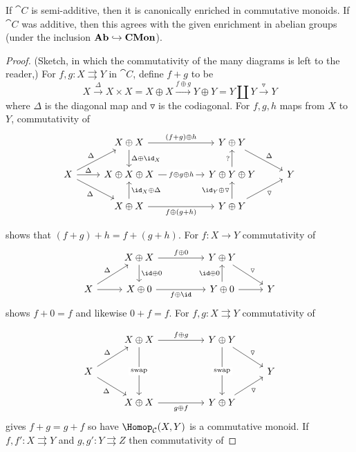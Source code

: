 \documentclass[../main.tex]{subfiles}
\begin{document}
\begin{lem}
	If $\cat C$ is semi-additive, then it is canonically enriched in commutative monoids. If $\cat C$ was additive, then this agrees with the given enrichment in abelian groups (under the inclusion $\mathbf{Ab} \hookrightarrow \mathbf{CMon}$).
\end{lem}
\begin{proof}(Sketch, in which the commutativity of the many diagrams is left to the reader,)
	For $f, g: X \rightrightarrows Y$ in $\cat C$, define $f + g$ to be
	\[
		X \xrightarrow{\Delta} X \times X = X \oplus X \xrightarrow{f \oplus g} Y \oplus Y = Y \coprod Y \xrightarrow{\triangledown} Y
	\] where $\Delta$ is the diagonal map and $\triangledown$ is the codiagonal.
	For $f, g, h$ maps from $X$ to $Y$, commutativity of 
\[\begin{tikzcd}
	& {X\oplus X} && {Y\oplus Y} \\
	X & {X\oplus X\oplus X} && {Y\oplus Y\oplus Y} & Y \\
	& {X\oplus X} && {Y\oplus Y}
	\arrow["\Delta", from=2-1, to=1-2]
	\arrow["{\id_X \oplus \Delta}"', from=3-2, to=2-2]
	\arrow["{\Delta \oplus \id_X}", from=1-2, to=2-2]
	\arrow["\Delta", from=2-1, to=2-2]
	\arrow["\Delta"', from=2-1, to=3-2]
	\arrow["{f \oplus(g+h)}"', from=3-2, to=3-4]
	\arrow["{(f+g)\oplus h}", from=1-2, to=1-4]
	\arrow["{?}", from=2-4, to=1-4]
	\arrow["{\id_Y \oplus \triangledown}", from=3-4, to=2-4]
	\arrow["\triangledown"', from=3-4, to=2-5]
	\arrow["\Delta", from=1-4, to=2-5]
	\arrow["{f\oplus g\oplus h}"{description}, from=2-2, to=2-4]
\end{tikzcd}\]	

	shows that $(f+g) + h = f + (g + h)$. For $f: X \to Y$ commutativity of 
\[\begin{tikzcd}
	& {X\oplus X} && {Y\oplus Y} \\
	X & {X \oplus 0} && {Y\oplus 0} & Y
	\arrow[from=2-1, to=2-2]
	\arrow["\id\oplus0", from=1-2, to=2-2]
	\arrow["\Delta", from=2-1, to=1-2]
	\arrow["{f\oplus \id}"', from=2-2, to=2-4]
	\arrow["{f\oplus 0}", from=1-2, to=1-4]
	\arrow["\triangledown", from=1-4, to=2-5]
	\arrow[from=2-4, to=2-5]
	\arrow["{\id \oplus 0}", from=2-4, to=1-4]
\end{tikzcd}\]	
	 shows $f + 0 = f$ and likewise $ 0 + f = f$.
	 For $f,g: X \rightrightarrows Y$ commutativity of 
	
\[\begin{tikzcd}
	& {X\oplus X} && {Y\oplus Y} \\
	X &&&& Y \\
	& {X\oplus X} && {Y\oplus Y}
	\arrow["\triangledown", from=1-4, to=2-5]
	\arrow["\triangledown"', from=3-4, to=2-5]
	\arrow["{g \oplus f}"', from=3-2, to=3-4]
	\arrow["{f\oplus g}", from=1-2, to=1-4]
	\arrow["\Delta", from=2-1, to=1-2]
	\arrow["\Delta"', from=2-1, to=3-2]
	\arrow["{\text{swap}}"{description}, from=1-2, to=3-2]
	\arrow["{\text{swap}}"{description}, from=1-4, to=3-4]
\end{tikzcd}\]	 gives $f + g = g + f$ so have $\Hom_{\cat C}(X,Y)$ is a commutative monoid. If $f,f': X \rightrightarrows Y$ and $g,g':Y  \rightrightarrows Z$ then commutativity of 


\end{proof}
\end{document}
